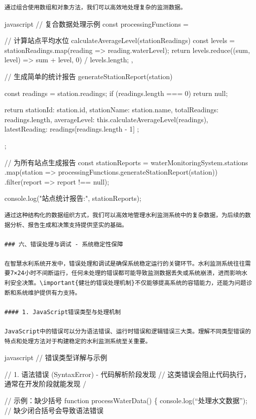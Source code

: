 {\begin{lstlisting}
通过组合使用数组和对象方法，我们可以高效地处理复杂的监测数据。

\end{lstlisting}javascript
// 复合数据处理示例
const processingFunctions = {
    // 计算站点平均水位
    calculateAverageLevel(stationReadings) {
        const levels = stationReadings.map(reading => reading.waterLevel);
        return levels.reduce((sum, level) => sum + level, 0) / levels.length;
    },
    
    // 生成简单的统计报告
    generateStationReport(station) {
        const readings = station.readings;
        if (readings.length === 0) return null;
        
        return {
            stationId: station.id,
            stationName: station.name,
            totalReadings: readings.length,
            averageLevel: this.calculateAverageLevel(readings),
            latestReading: readings[readings.length - 1]
        };
    }
};

// 为所有站点生成报告
const stationReports = waterMonitoringSystem.stations
    .map(station => processingFunctions.generateStationReport(station))
    .filter(report => report !== null);

console.log("站点统计报告:", stationReports);
\begin{lstlisting}
通过这种结构化的数据组织方式，我们可以高效地管理水利监测系统中的复杂数据，为后续的数据分析、报告生成和决策支持提供坚实的基础。

### 六、错误处理与调试 - 系统稳定性保障

在智慧水利系统开发中，错误处理和调试是确保系统稳定运行的关键环节。水利监测系统往往需要7×24小时不间断运行，任何未处理的错误都可能导致监测数据丢失或系统崩溃，进而影响水利安全决策。\important{健壮的错误处理机制}不仅能够提高系统的容错能力，还能为问题诊断和系统维护提供有力支持。

#### 1. JavaScript错误类型与处理机制

JavaScript中的错误可以分为语法错误、运行时错误和逻辑错误三大类。理解不同类型错误的特点和处理方法对于构建稳定的水利监测系统至关重要。

\end{lstlisting}javascript
// 错误类型详解与示例

// 1. 语法错误 (SyntaxError) - 代码解析阶段发现
// 这类错误会阻止代码执行，通常在开发阶段就能发现
/} // 示例：缺少括号 function processWaterData() \{ console.log(``处理水文数据''); // 缺少闭合括号会导致语法错误 
